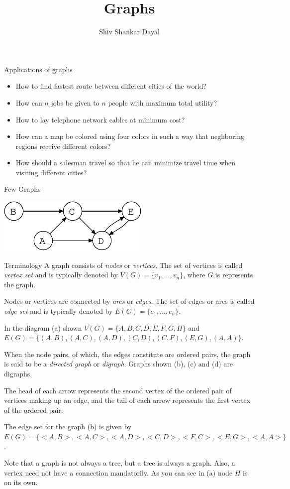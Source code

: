 \documentclass[aspectratio=169,8pt]{beamer}
\title{Graphs}
\author[Shiv Shankar Dayal]{Shiv Shankar Dayal}
\begin{document}
\begin{frame}
  \titlepage
\end{frame}
\begin{frame}{Applications of graphs}
  \begin{itemize}
  \item How to find fastest route between different cities of the world?
  \item How can $n$ jobs be given to $n$ people with maximum total utility?
  \item How to lay telephone network cables at minimum cost?
  \item How can a map be colored using four colors in such a way that neghboring regions receive different
    colors?
  \item How should a salesman travel so that he can minimize travel time when visiting different cities?
  \end{itemize}
\end{frame}
\begin{frame}{Few Graphs}
  \begin{center}
    \includegraphics[scale=0.5]{graph}
  \end{center}
\end{frame}
\begin{frame}{Terminology}
  A graph consists of {\it nodes} or {\it vertices}. The set of vertices is called {\it vertex set} and is
  typically denoted by $V(G) = \{v_1, \ldots, v_n\}$, where $G$ is represents the graph.

  Nodes or vertices are connected by {\it arcs} or {\it edges}. The set of edges or arcs is called {\it edge set}
  and is typically denoted by $E(G) = \{e_1, \ldots, e_n\}$.

  In the diagram (a) shown $V(G) = \{A, B, C, D, E, F, G, H\}$ and $E(G) = \{(A, B), (A, C), (A, D), (C, D), (C, F),
  (E, G), (A, A)\}$.

  When the node pairs, of which, the edges constitute are ordered pairs, the graph is said to be a {\it directed
    graph} or {\it digraph}. Graphs shown (b), (c) and (d) are digraphs.

  The head of each arrow represents the second vertex of the ordered pair of vertices making up an edge, and the tail
  of each arrow represents the first vertex of the ordered pair.

  The edge set for the graph (b) is given by $E(G) = \{<A, B>, <A, C>, <A, D>, <C, D>, <F, C>, <E, G>, <A, A>\}$.

  Note that a graph is not always a tree, but a tree is always a graph. Also, a vertex need not have a connection
  mandatorily. As you can see in (a) node $H$ is on its own.
\end{frame}
\end{document}

